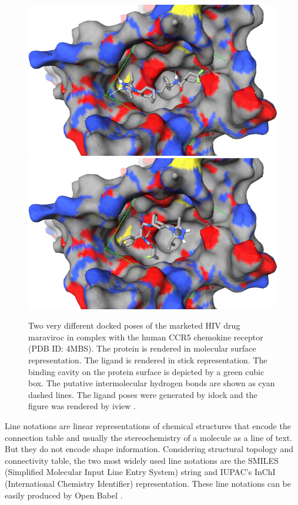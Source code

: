 \documentclass[twocolumn]{svjour3}          %
\begin{document}
\begin{figure}
\centering
\includegraphics[width=1.36\textwidth,natwidth=638,natheight=386]{../usrt/MRV0.png}
\endminipage
{}
\centering
\includegraphics[width=1.36\textwidth,natwidth=638,natheight=386]{../usrt/MRV1.png}
\endminipage
\caption{Two very different docked poses of the marketed HIV drug maraviroc in complex with the human CCR5 chemokine receptor (PDB ID: 4MBS). The protein is rendered in molecular surface representation. The ligand is rendered in stick representation. The binding cavity on the protein surface is depicted by a green cubic box. The putative intermolecular hydrogen bonds are shown as cyan dashed lines. The ligand poses were generated by idock \cite{1153} and the figure was rendered by iview \cite{1366}.}
\label{fig:MRV}
\end{figure}

Line notations are linear representations of chemical structures that encode the connection table and usually the stereochemistry of a molecule as a line of text. But they do not encode shape information. Considering structural topology and connectivity table, the two most widely used line notations are the SMILES (Simplified Molecular Input Line Entry System) string \cite{} and IUPAC’s InChI (International Chemistry Identifier) representation. These line notations can be easily produced by Open Babel \cite{968}.
\end{document}
